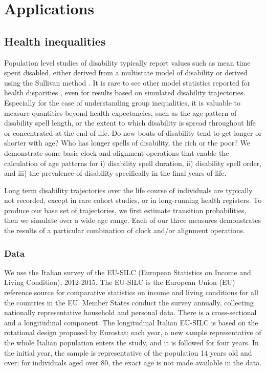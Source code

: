 \documentclass{article}
\begin{document}



\section{Applications}

\subsection{Health inequalities}
Population level studies of disability typically report values such as mean time spent disabled, either derived from a multistate model of disability \citep{crimmins2009change} or derived using the Sullivan method \citep{Sullivan1970,Crimmins1997}. It is rare to see other model statistics reported for health disparities \citep{laditka1998new}, even for results based on simulated disability trajectories. Especially for the case of understanding group inequalities, it is valuable to measure quantities beyond health expectancies, such as the age pattern of disability spell length, or the extent to which disability is spread throughout life or concentrated at the end of life. Do new bouts of disability tend to get longer or shorter with age? Who has longer spells of disability, the rich or the poor? We demonstrate some basic clock and alignment operations that enable the calculation of age patterns for i) disability spell duration, ii) disability spell order, and iii) the prevalence of disability specifically in the final years of life.

Long term disability trajectories over the life course of individuals are typically not recorded, except in rare cohort studies, or in long-running health registers. To produce our base set of trajectories, we first estimate transition probabilities, then we simulate over a wide age range. Each of our three measures demonstrates the results of a particular combination of clock and/or alignment operations.

\subsubsection{Data}
We use the Italian survey of the EU-SILC (European Statistics on Income and Living Condition), 2012-2015. The EU-SILC is the European Union (EU) reference source for comparative statistics on income and living conditions for all the countries in the EU. Member States conduct the survey annually, collecting nationally representative household and personal data. There is a cross-sectional and a longitudinal component. The longitudinal Italian EU-SILC is based on the rotational design proposed by Eurostat; each year, a new sample representative of the whole Italian population enters the study, and it is followed for four years. In the initial year, the sample is representative of the population 14 years old and over; for individuals aged over 80, the exact age is not made available in the data.
\end{document}
